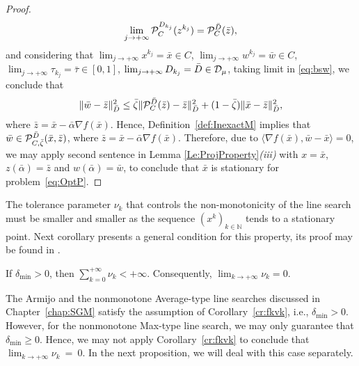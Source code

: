 \begin{proof}
	$$
		\lim_{j \to +\infty}{\cal P}_{C}^{D_{k_j}}(z^{k_j})= {\cal P}_{C}^{\bar D}(\bar{z}),
	$$
	and considering that $\lim_{j\to +\infty} x^{k_j} = \bar{x}\in C$, $\lim_{j\to +\infty} w^{k_j} = \bar{w}\in C$, $\lim_{j \to +\infty} \tau_{k_j} = \bar{\tau} \in [0,1]$,   $\lim_{j \to +\infty} D_{k_j} = \bar{D}\in {\cal D}_{\mu}$, taking limit in \eqref{eq:bsw},  we conclude that
	$$
		\|\bar{w} -\bar{z}\|_{\bar D}^2\leq  {\bar \zeta}  \| {\cal P}_{C}^{\bar D}(\bar{z})-\bar{z}\|_{\bar D}^2+(1- {\bar \zeta} )\| \bar{x}-\bar{z}\|_{\bar D}^2 ,
	$$
	where $\bar{z} = \bar{x}-{\bar \alpha} \nabla f(\bar{x})$. Hence, Definition~\ref{def:InexactM} implies  that ${\bar w}\in  {\cal P}_{C,{\bar \zeta}}^{\bar D}( {\bar x}, {\bar z})$, where $\bar{z} = \bar{x}-{\bar \alpha} \nabla f(\bar{x})$. Therefore, due to $\langle \nabla f(\bar{x}), \bar{w}-\bar{x} \rangle = 0$, we may apply second sentence in Lemma \ref{Le:ProjProperty}{\it (iii)} with $x = \bar{x}$, $z({\bar \alpha}) = \bar{z}$ and $w({\bar \alpha}) = \bar{w}$, to conclude that $\bar{x}$ is stationary for problem~\eqref{eq:OptP}.
\end{proof}



The tolerance parameter $\nu_{k}$ that controls the non-monotonicity of the line search must be smaller and smaller as the sequence $(x^k)_{k\in\mathbb{N}}$  tends to  a stationary point. Next corollary presents a general condition for this property, its proof may be found in \cite[Theorem 4]{GrapigliaSachs2017}.
\begin{corollary} \label{cr:fkvk}
	If $\delta_{\min}>0$,  then  $\sum_{k=0}^{+\infty} \nu_k<+\infty$. Consequently, $\lim_{k\to +\infty} \nu_{k} = 0$.
\end{corollary}

The Armijo and the nonmonotone Average-type line searches discussed in Chapter~\ref{chap:SGM} satisfy  the assumption of Corollary~\ref{cr:fkvk}, i.e., $\delta_{\min}>0$.  However,    for  the  nonmonotone Max-type line search,  we   may only guarantee that $\delta_{\min}\geq 0$. Hence,  we may not apply  Corollary~\ref{cr:fkvk}  to conclude that $\lim_{k\to +\infty} \nu_{k}~=~0$.  In the next proposition, we will deal with this case separately.

